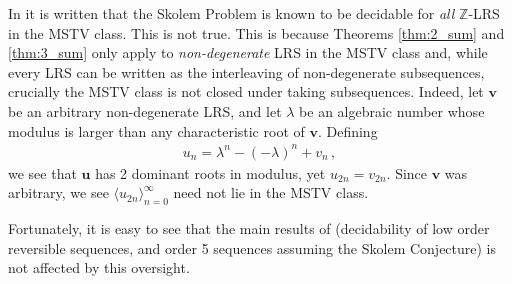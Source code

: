 \documentclass{theoretics}
\newcommand{\Z}{\mathbb{Z}}
\newcommand{\LRS}[1]{{\bm{#1}}}
\begin{document}
In \cite{Lipton_2022} it is written that the Skolem Problem is known to be decidable for \emph{all} $\Z$-LRS in the MSTV class. This is not true. This is because Theorems \ref{thm:2_sum} and \ref{thm:3_sum} only apply to \emph{non-degenerate} LRS in the MSTV class and, while every LRS can be written as the interleaving of non-degenerate subsequences, crucially the MSTV class is not closed under taking subsequences. Indeed, let $\LRS{v}$ be an arbitrary non-degenerate LRS, and let $\lambda$ be an algebraic number whose modulus is larger than any characteristic root of $\LRS{v}$. Defining 
\begin{align*}
    u_n = \lambda^n - (-\lambda)^n + v_n \, ,
\end{align*}
we see that $\LRS{u}$ has 2 dominant roots in modulus, yet $u_{2n} = v_{2n}$. Since $\LRS{v}$ was arbitrary, we see $\langle u_{2n} \rangle_{n=0}^\infty$ need not lie in the MSTV class.

Fortunately, it is easy to see that the main results of \cite{Lipton_2022} (decidability of low order reversible sequences, and order 5 sequences assuming the Skolem Conjecture) is not affected by this oversight.
\end{document}
